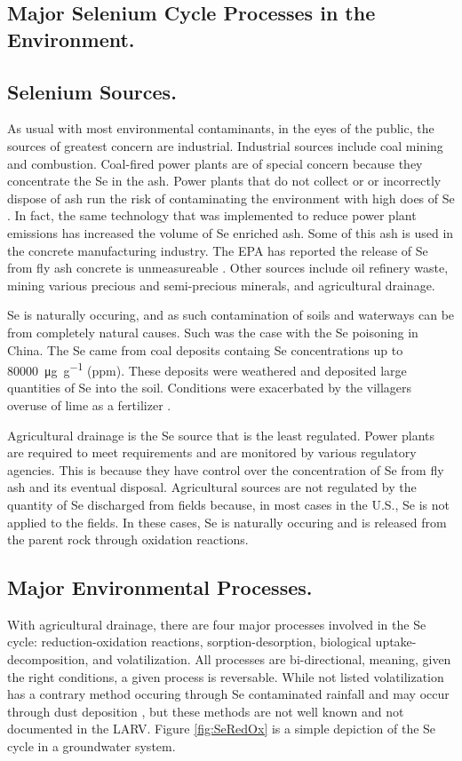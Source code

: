 \begin{linenumbers}[1]
\clearpage{}

\section{Major Selenium Cycle Processes in the Environment.}
\label{sec:major processes}

\subsection*{Selenium Sources.}
As usual with most environmental contaminants, in the eyes of the public, the sources of greatest concern are industrial.  Industrial sources include coal mining and combustion.  Coal-fired power plants are of special concern because they concentrate the Se in the ash.  Power plants that do not collect or or incorrectly dispose of ash run the risk of contaminating the environment with high does of Se \todoc.  In fact, the same technology that was implemented to reduce power plant emissions has increased the volume of Se enriched ash.  Some of this ash is used in the concrete manufacturing industry.  The EPA has reported the release of Se from fly ash concrete is unmeasureable \citep{EPA2014}.  Other sources include oil refinery waste, mining various precious and semi-precious minerals, and agricultural drainage.

Se is naturally occuring, and as such contamination of soils and waterways can be from completely natural causes.  Such was the case with the Se poisoning in China.  The Se came from coal deposits containg Se concentrations up to \SI{80000}{\micro\gram\per\gram} (ppm).  These deposits were weathered and deposited large quantities of Se into the soil.   Conditions were exacerbated by the villagers overuse of lime as a fertilizer \citep{yang1983}.

Agricultural drainage is the Se source that is the least regulated.  Power plants are required to meet requirements and are monitored by various regulatory agencies.  This is because they have control over the concentration of Se from fly ash and its eventual disposal.  Agricultural sources are not regulated by the quantity of Se discharged from fields because, in most cases in the U.S., Se is not applied to the fields.  In these cases, Se is naturally occuring and is released from the parent rock through oxidation reactions.  

\subsection*{Major Environmental Processes.}
With agricultural drainage, there are four major processes involved in the Se cycle: reduction-oxidation reactions, sorption-desorption, biological uptake-decomposition, and volatilization.  All processes are bi-directional, meaning, given the right conditions, a given process is reversable.  While not listed volatilization has a contrary method occuring through Se contaminated rainfall \todoc and may occur through dust deposition \todoc, but these methods are not well known and not documented in the LARV.  Figure \ref{fig:SeRedOx} is a simple depiction of the Se cycle in a groundwater system.


\end{linenumbers}
